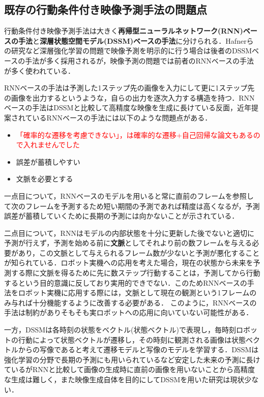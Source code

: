\subsection{既存の行動条件付き映像予測手法の問題点}

行動条件付き映像予測手法は大きく{\bf 再帰型ニューラルネットワーク(RNN)ベースの手法}と{\bf 深層状態空間モデル(DSSM)ベースの手法}に分けられる．Hafnerら\cite{hafner2019planet}の研究など深層強化学習の問題で映像予測を明示的に行う場合は後者のDSSMベースの手法が多く採用されるが，映像予測の問題では前者のRNNベースの手法が多く使われている\cite{denton2018stochastic}\cite{villegas2019high}．

RNNベースの手法は予測した1ステップ先の画像を入力にして更に1ステップ先の画像を出力するというような，自らの出力を逐次入力する構造を持つ．RNNベースの手法はDSSMと比較して高精度な映像を生成に長けている反面，近年提案されているRNNベースの手法には以下のような問題点がある．

\begin{itemize}
    \item \textcolor{red}{「確率的な遷移を考慮できない」，は確率的な遷移+自己回帰な論文もあるので入れませんでした}
    \item 誤差が蓄積しやすい
    \item 文脈を必要とする
\end{itemize}

一点目について，RNNベースのモデルを用いると常に直前のフレームを参照して次のフレームを予測するため短い期間の予測であれば精度は高くなるが，予測誤差が蓄積していくために長期の予測には向かないことが示されている\cite{hafner2019planet}．

二点目について，RNNはモデルの内部状態を十分に更新した後でないと適切に予測が行えず，予測を始める前に{\bf 文脈}としてそれより前の数フレームを与える必要があり，この文脈として与えられるフレーム数が少ないと予測が悪化することが知られている\cite{villegas2019high}．ロボット実機への応用を考えた場合，現在の状態から未来を予測する際に文脈を得るために先に数ステップ行動することは，予測してから行動するという目的意識に反しており実用的できでない．このためRNNベースの手法をロボット実機に応用する際には，文脈として現在の観測という1フレームのみ与れば十分機能するように改善する必要がある．
このように，RNNベースの手法は制約がありそもそも実ロボットへの応用に向いていない可能性がある．

一方，DSSMは各時刻の状態をベクトル(状態ベクトル)で表現し，毎時刻ロボットの行動によって状態ベクトルが遷移し，その時刻に観測される画像は状態ベクトルからの写像であると考えて遷移モデルと写像のモデルを学習する．DSSMは強化学習の分野で長期の予測にも用いられているなど安定した未来の予測に長けているがRNNと比較して画像の生成時に直前の画像を用いないことから高精度な生成は難しく，また映像生成自体を目的にしてDSSMを用いた研究は現状少ない．

